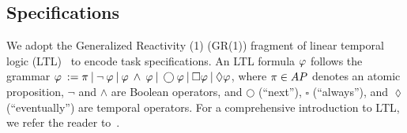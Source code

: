 \subsection{Specifications}


We adopt the Generalized Reactivity (1) (GR(1)) fragment of linear temporal logic (LTL)~\citep{bloem2012synthesis} to encode task specifications.
An LTL formula $\varphi$ follows the grammar
$\varphi \: := \pi \:|\: \neg\: \varphi \:|\: \varphi \:\land\: \varphi \:|\: \bigcirc\varphi \:|\: \square \varphi \:|\: \lozenge \varphi$,
where $\pi \in AP$ denotes an atomic proposition,
$\neg$ and $\land$ are Boolean operators,
and $\bigcirc$ (``next''), $\square$ (``always''), and $\lozenge$ (``eventually'') are temporal operators.
For a comprehensive introduction to LTL, we refer the reader to~\citep{baier2008principles}.

